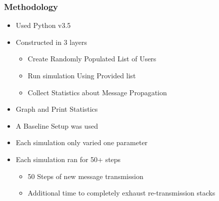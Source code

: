 \begin{frame}
    \frametitle{Methodology}
    \begin{itemize}
        \item Used Python v3.5
        \item Constructed in 3 layers
        \begin{itemize}
            \item Create Randomly Populated List of Users
            \item Run simulation Using Provided list
            \item Collect Statistics about Message Propagation
        \end{itemize}
        \item Graph and Print Statistics\\[0.5cm]
    \end{itemize}
    
    \begin{itemize}
        \item A Baseline Setup was used
        \item Each simulation only varied one parameter
        \item Each simulation ran for 50+ steps
        \begin{itemize}
            \item 50 Steps of new message transmission
            \item Additional time to completely exhaust re-transmission stacks
        \end{itemize}
    \end{itemize}
\end{frame}

